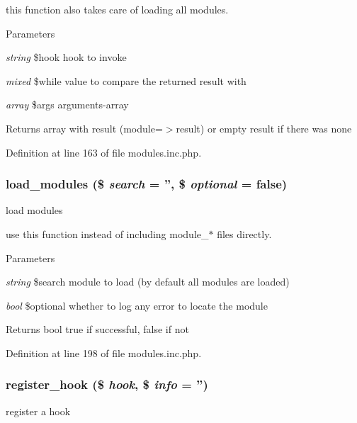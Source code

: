 this function also takes care of loading all modules. 
\begin{DoxyParams}{Parameters}
\item[{\em string}]\$hook hook to invoke \item[{\em mixed}]\$while value to compare the returned result with \item[{\em array}]\$args arguments-\/array \end{DoxyParams}
\begin{DoxyReturn}{Returns}
array with result (module=$>$result) or empty result if there was none 
\end{DoxyReturn}


Definition at line 163 of file modules.inc.php.

\hypertarget{modules_8inc_8php_a23f8be02dc2148a3c860119a1d6ea276}{
\subsubsection[{load\_\-modules}]{\setlength{\rightskip}{0pt plus 5cm}load\_\-modules (\$ {\em search} = {\ttfamily ''}, \/  \$ {\em optional} = {\ttfamily false})}}
\label{modules_8inc_8php_a23f8be02dc2148a3c860119a1d6ea276}
load modules

use this function instead of including module\_\-$\ast$ files directly. 
\begin{DoxyParams}{Parameters}
\item[{\em string}]\$search module to load (by default all modules are loaded) \item[{\em bool}]\$optional whether to log any error to locate the module \end{DoxyParams}
\begin{DoxyReturn}{Returns}
bool true if successful, false if not 
\end{DoxyReturn}


Definition at line 198 of file modules.inc.php.

\hypertarget{modules_8inc_8php_ad91a5f96df0655d782404170324e567d}{
\subsubsection[{register\_\-hook}]{\setlength{\rightskip}{0pt plus 5cm}register\_\-hook (\$ {\em hook}, \/  \$ {\em info} = {\ttfamily ''})}}
\label{modules_8inc_8php_ad91a5f96df0655d782404170324e567d}
register a hook

